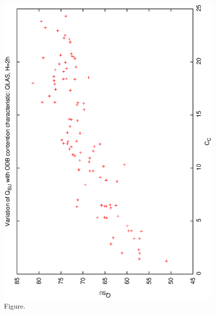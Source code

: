\documentclass[12pt,a4paper]{article}
\begin{document}
\begin{figure}[htbp]
 \begin{center}
  \includegraphics[scale=1.0, angle=0]{figures/qsucc_ql2.eps}
 \end{center}
  \caption[Figure.]
{Figure.}
\end{figure}
\clearpage
\end{document}

